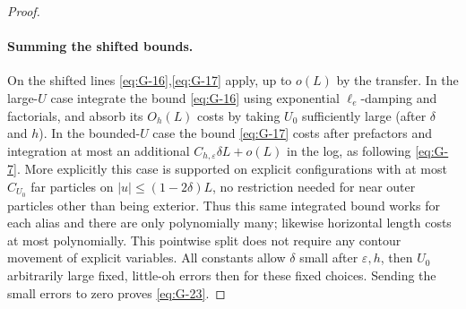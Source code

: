 \begin{proof}
\paragraph{Summing the shifted bounds.}
On the shifted lines \eqref{eq:G-16},\eqref{eq:G-17} apply, up to \(o(L)\) by the transfer. In the large-\(U\) case integrate the bound \eqref{eq:G-16} using exponential \(\ell_e\)-damping and factorials, and absorb its \(O_h(L)\) costs by taking \(U_0\) sufficiently large (after \(\delta\) and \(h\)). In the bounded-\(U\) case the bound \eqref{eq:G-17} costs after prefactors and integration at most an additional \(C_{h,\varepsilon}\delta L+o(L)\) in the log, as following \eqref{eq:G-7}. More explicitly this case is supported on explicit configurations with at most \(C_{U_0}\) far particles on \(|u|\le(1-2\delta)L\), no restriction needed for near outer particles other than being exterior. Thus this same integrated bound works for each alias and there are only polynomially many; likewise horizontal length costs at most polynomially. This pointwise split does not require any contour movement of explicit variables. All constants allow \(\delta\) small after \(\varepsilon,h\), then \(U_0\) arbitrarily large fixed, little-oh errors then for these fixed choices. Sending the small errors to zero proves \eqref{eq:G-23}.
\end{proof}

